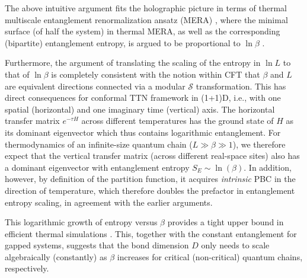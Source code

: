 \documentclass[aps,prx,twocolumn,showpacs,psfig,superscriptaddress,longbibliography]{revtex4-1}
\begin{document}
The above intuitive argument fits the holographic picture in terms
of thermal multiscale entanglement renormalization ansatz (MERA)
\cite{TNR-MERA}, where the minimal surface (of half the system) in
thermal MERA, as well as the corresponding (bipartite) entanglement
entropy, is argued to be proportional to $\ln{\beta}$
\cite{Swingle-holography}.

Furthermore, the argument of translating the scaling of the entropy
in $\ln L$ to that of $\ln \beta$ is completely consistent with the
notion within CFT that $\beta$ and $L$ are equivalent directions
connected via a modular $\mathcal{S}$ transformation.  This has
direct consequences for conformal TTN framework in (1+1)D, i.e.,
with one spatial (horizontal) and one imaginary time (vertical)
axis.  The horizontal transfer matrix $e^{-\tau H}$ across different
temperatures has the ground state of $H$ as its dominant eigenvector
which thus contains logarithmic entanglement.  For thermodynamics of
an infinite-size quantum chain ($L\gg \beta \gg1$), we therefore
expect that the vertical transfer matrix (across different
real-space sites) also has a dominant eigenvector  {with entanglement 
entropy $S_E\sim\ln(\beta)$}. In
addition, however, by definition of the partition function, it
acquires {\it intrinsic} PBC in the direction of temperature, which
therefore doubles the prefactor in entanglement entropy scaling, in
agreement with the earlier arguments.

This logarithmic growth of entropy versus $\beta$ provides a tight
upper bound in efficient thermal simulations
\cite{Barthel.t:2017:FiniteT}.  This, together with the constant
entanglement for gapped systems, suggests that the bond dimension
$D$ only needs to scale algebraically (constantly) as $\beta$
increases for critical (non-critical) quantum chains, respectively.
\end{document}
